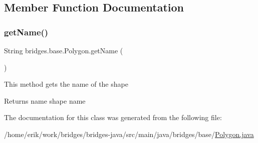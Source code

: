 \subsection{Member Function Documentation}
\mbox{\label{classbridges_1_1base_1_1_polygon_a2203367acb1a26dfa1a81d69ce61274f}} 
\subsubsection{\texorpdfstring{get\+Name()}{getName()}}
{\footnotesize\ttfamily String bridges.\+base.\+Polygon.\+get\+Name (\begin{DoxyParamCaption}{ }\end{DoxyParamCaption})}

This method gets the name of the shape

\begin{DoxyReturn}{Returns}
name shape name 
\end{DoxyReturn}


The documentation for this class was generated from the following file\+:\begin{DoxyCompactItemize}
\item 
/home/erik/work/bridges/bridges-\/java/src/main/java/bridges/base/\hyperlink{_polygon_8java}{Polygon.\+java}\end{DoxyCompactItemize}
